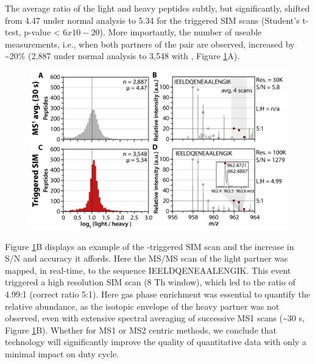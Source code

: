 The average ratio of the light and heavy peptides subtly, but significantly, shifted from 4.47 under normal analysis to 5.34 for the \inseq{} triggered SIM scans (Student's t-test, p-value < $6x10-20$). More importantly, the number of useable measurements, i.e., when both partners of the pair are observed, increased by \textasciitilde20\% (2,887 under normal analysis to 3,548 with \inseq{}, Figure \ref{fig:inseqs5}A).
\begin{figure}
	\centering
	\includegraphics[width=\columnwidth]{inseq/inSeq_Fig S5.png}
	\label{fig:inseqs5}
\end{figure}
Figure \ref{fig:inseqs5}B displays an example of the \inseq{}-triggered SIM scan and the increase in S/N and accuracy it affords. Here the MS/MS scan of the light partner was mapped, in real-time, to the sequence IEELDQENEAALENGIK. This event triggered a high resolution SIM scan (8 Th window), which led to the ratio of 4.99:1 (correct ratio 5:1). Here gas phase enrichment was essential to quantify the relative abundance, as the isotopic envelope of the heavy partner was not observed, even with extensive spectral averaging of successive MS1 scans (\textasciitilde30 s, Figure \ref{fig:inseqs5}B). Whether for MS1 or MS2 centric methods, we conclude that \inseq{} technology will significantly improve the quality of quantitative data with only a minimal impact on duty cycle.

